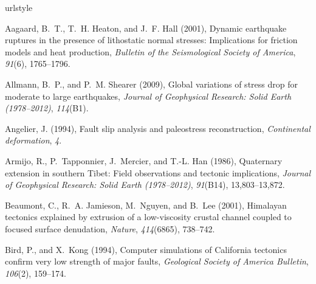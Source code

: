 \documentclass[draft,jgrga]{AGUTeX}
\begin{document}
\begin{article}

%

\begin{thebibliography}{90}
\providecommand{\natexlab}[1]{#1}
\expandafter\ifx\csname urlstyle\endcsname\relax
  \providecommand{\doi}[1]{doi:\discretionary{}{}{}#1}\else
  \providecommand{\doi}{doi:\discretionary{}{}{}\begingroup
  \urlstyle{rm}\Url}\fi

Aagaard, B.~T., T.~H. Heaton, and J.~F. Hall (2001), Dynamic earthquake
  ruptures in the presence of lithostatic normal stresses: {I}mplications for
  friction models and heat production, \textit{Bulletin of the Seismological
  Society of America}, \textit{91}(6), 1765--1796.

Allmann, B.~P., and P.~M. Shearer (2009), Global variations of stress drop for
  moderate to large earthquakes, \textit{Journal of Geophysical Research: Solid
  Earth (1978--2012)}, \textit{114}(B1).

Angelier, J. (1994), Fault slip analysis and paleostress reconstruction,
  \textit{Continental deformation}, \textit{4}.

Armijo, R., P.~Tapponnier, J.~Mercier, and T.-L. Han (1986), Quaternary
  extension in southern {T}ibet: {F}ield observations and tectonic
  implications, \textit{Journal of Geophysical Research: Solid Earth
  (1978--2012)}, \textit{91}(B14), 13,803--13,872.

Beaumont, C., R.~A. Jamieson, M.~Nguyen, and B.~Lee (2001), Himalayan tectonics
  explained by extrusion of a low-viscosity crustal channel coupled to focused
  surface denudation, \textit{Nature}, \textit{414}(6865), 738--742.

Bird, P., and X.~Kong (1994), Computer simulations of {C}alifornia tectonics
  confirm very low strength of major faults, \textit{Geological Society of
  America Bulletin}, \textit{106}(2), 159--174.


\end{thebibliography}
\end{article}
\end{document}
